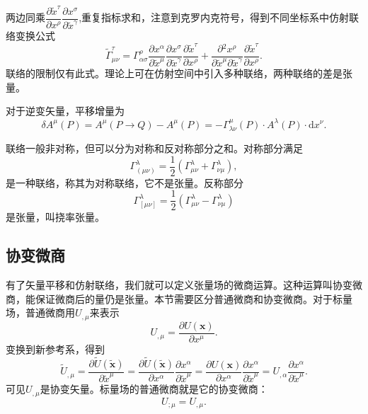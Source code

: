 \documentclass[11pt, a4paper, oneside, onecolumn]{ctexart}
\numberwithin{equation}{subsection}
\begin{document}
两边同乘$\dfrac{\partial{}\widetilde{x}^{\tau}}{\partial{}x^{\rho}}\dfrac{\partial{}x^{\sigma}}{\partial{}\widetilde{x}^{\gamma}}$,重复指标求和，注意到克罗内克符号，得到不同坐标系中仿射联络变换公式
\begin{equation}
\widetilde{\Gamma}_{\mu\nu}^{\tau}=\Gamma_{\alpha\sigma}^{\rho}\frac{\partial{}x^{\alpha}}{\partial{}\widetilde{x}^{\mu}}\frac{\partial{}x^{\sigma}}{\partial{}\widetilde{x}^{\gamma}}\frac{\partial{}\widetilde{x}^{\tau}}{\partial{}x^{\rho}}+\frac{\partial{}^{2}x^{\rho}}{\partial{}\widetilde{x}^{\mu}\partial\widetilde{x}^{\gamma}}\frac{\partial{}\widetilde{x}^{\tau}}{\partial{}x^{\rho}}.
\end{equation}
联络的限制仅有此式。理论上可在仿射空间中引入多种联络，两种联络的差是张量。

对于逆变矢量，平移增量为
\begin{equation}
\delta{}A^{\mu}\left(P\right)=A^{\mu}\left(P\to Q\right)-A^{\mu}\left(P\right)=-\Gamma_{\lambda\nu}^{\mu}\left(P\right)\cdot A^{\lambda}\left(P\right)\cdot \mathrm{d}x^{\nu}.
\end{equation}

联络一般非对称，但可以分为对称和反对称部分之和。对称部分满足
\begin{equation}
\Gamma_{\left(\mu\nu\right)}^{\lambda}=\frac{1}{2}\left(\Gamma_{\mu\nu}^{\lambda}+\Gamma^{\lambda}_{\nu\mu}\right),
\end{equation}
是一种联络，称其为对称联络，它不是张量。反称部分
\begin{equation}
\Gamma_{\left[\mu\nu\right]}^{\lambda}=\frac{1}{2}\left(\Gamma_{\mu\nu}^{\lambda}-\Gamma_{\nu\mu}^{\lambda}\right)
\end{equation}
是张量，叫挠率张量。

\subsection{协变微商}
有了矢量平移和仿射联络，我们就可以定义张量场的微商运算。这种运算叫协变微商，能保证微商后的量仍是张量。本节需要区分普通微商和协变微商。对于标量场，普通微商用$U_{,\mu}$来表示
\begin{equation}
U_{,\mu}=\frac{\partial{}U\left(\boldsymbol{x}\right)}{\partial{}x^{\mu}}.
\end{equation}
变换到新参考系，得到
\begin{equation}
\widetilde{U}_{,\mu}=\frac{\partial{}\widetilde{U}\left(\widetilde{\boldsymbol{x}}\right)}{\partial{}\widetilde{x}^{\mu}}=\frac{\partial{}\widetilde{U}\left(\widetilde{\boldsymbol{x}}\right)}{\partial{}x^{\alpha}}\frac{\partial{}x^{\alpha}}{\partial{}\widetilde{x}^{\mu}}=\frac{\partial{}U\left(\boldsymbol{x}\right)}{\partial{}x^{\alpha}}\frac{\partial{}x^{\alpha}}{\partial{}\widetilde{x}^{\mu}}=U_{,\alpha}\frac{\partial{}x^{\alpha}}{\partial{}\widetilde{x}^{\mu}}.
\end{equation}
可见$U_{,\mu}$是协变矢量。标量场的普通微商就是它的协变微商：
\begin{equation}
U_{;\mu}=U_{,\mu}.
\end{equation}
\end{document}
